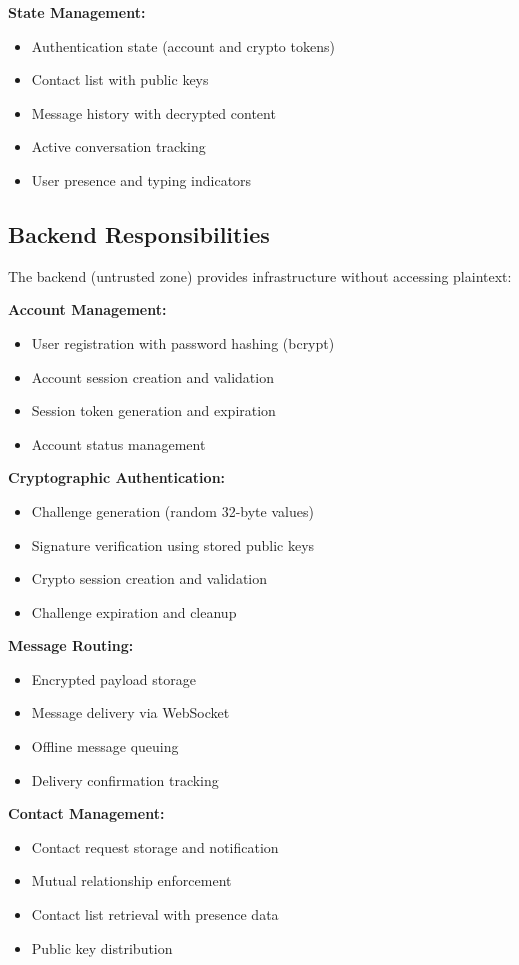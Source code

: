 \textbf{State Management:}
\begin{itemize}
    \item Authentication state (account and crypto tokens)
    \item Contact list with public keys
    \item Message history with decrypted content
    \item Active conversation tracking
    \item User presence and typing indicators
\end{itemize}

\subsection{Backend Responsibilities}

The backend (untrusted zone) provides infrastructure without accessing plaintext:

\textbf{Account Management:}
\begin{itemize}
    \item User registration with password hashing (bcrypt)
    \item Account session creation and validation
    \item Session token generation and expiration
    \item Account status management
\end{itemize}

\textbf{Cryptographic Authentication:}
\begin{itemize}
    \item Challenge generation (random 32-byte values)
    \item Signature verification using stored public keys
    \item Crypto session creation and validation
    \item Challenge expiration and cleanup
\end{itemize}

\textbf{Message Routing:}
\begin{itemize}
    \item Encrypted payload storage
    \item Message delivery via WebSocket
    \item Offline message queuing
    \item Delivery confirmation tracking
\end{itemize}

\textbf{Contact Management:}
\begin{itemize}
    \item Contact request storage and notification
    \item Mutual relationship enforcement
    \item Contact list retrieval with presence data
    \item Public key distribution
\end{itemize}

